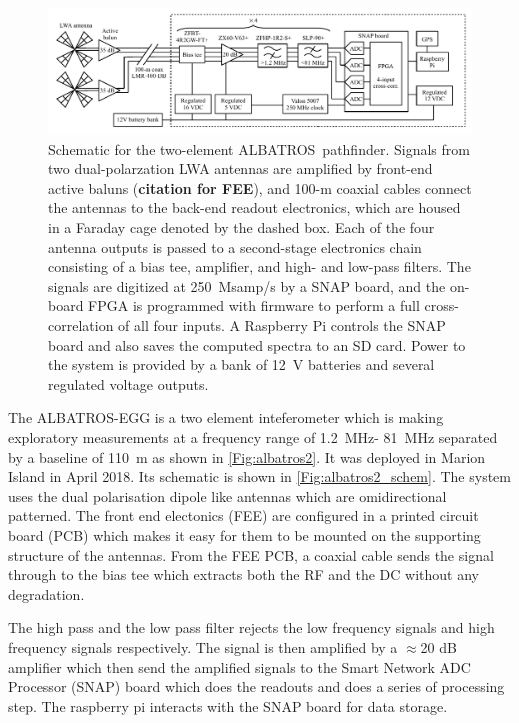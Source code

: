 \documentclass{ws-jai}
\def\albatros{ALBATROS}
\begin{document}
\begin{figure}
  \begin{center}
    \includegraphics[width=1.0\linewidth]{Figures/albatros_2elem_schematic/albatros_2elem_schematic.pdf}
    \caption{Schematic for the two-element \albatros\ pathfinder.
      Signals from two dual-polarzation LWA antennas are amplified by
      front-end active baluns ({\bf citation for FEE}), and 100-m
      coaxial cables connect the antennas to the back-end readout
      electronics, which are housed in a Faraday cage denoted by the
      dashed box.  Each of the four antenna outputs is passed to a
      second-stage electronics chain consisting of a bias tee,
      amplifier, and high- and low-pass filters.  The signals are
      digitized at 250~Msamp/s by a SNAP board, and the on-board FPGA
      is programmed with firmware to perform a full cross-correlation
      of all four inputs.  A Raspberry Pi controls the SNAP board and
      also saves the computed spectra to an SD card.  Power to the
      system is provided by a bank of 12~V batteries and several
      regulated voltage outputs.}
    \label{Fig:albatros2_schem}
  \end{center}
\end{figure}

The ALBATROS-EGG is a two element inteferometer which is making
exploratory measurements at a frequency range of \SI{1.2}{MHz}-
\SI{81}{MHz} separated by a baseline of \SI{110}{m} as shown in
\autoref{Fig:albatros2}. It was deployed in Marion Island in April
2018. Its schematic is shown in \autoref{Fig:albatros2_schem}. The
system uses the dual polarisation dipole like antennas which are
omidirectional patterned. The front end electonics (FEE) are
configured in a printed circuit board (PCB) which makes it easy for
them to be mounted on the supporting structure of the antennas. From
the FEE PCB, a coaxial cable sends the signal through to the bias tee
which extracts both the RF and the DC without any degradation.

The high pass and the low pass filter rejects the low frequency
signals and high frequency signals respectively. The signal is then
amplified by a $\approx$20 dB amplifier which then send the amplified
signals to the Smart Network ADC Processor (SNAP) board which does the
readouts and does a series of processing step. The raspberry pi
interacts with the SNAP board for data storage.
\end{document}
